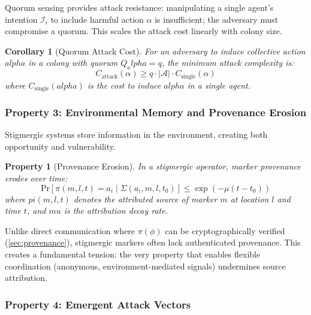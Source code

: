 \documentclass[
]{article}
\newtheorem{corollary}[theorem]{Corollary}
\newtheorem{property}{Property}[section]
\begin{document}
Quorum sensing provides attack resistance: manipulating a single agent's
intention \(\mathcal{I}_i\) to include harmful action \(\alpha\) is
insufficient; the adversary must compromise a quorum. This scales the
attack cost linearly with colony size.

\begin{corollary}[Quorum Attack Cost]
\label{cor:quorum-attack-cost}
For an adversary to induce collective action $alpha$ in a colony with quorum $Q_alpha = q$, the minimum attack complexity is:
\begin{equation}
\label{eq:quorum-cost}
C_{\text{attack}}(\alpha) \geq q \cdot |\mathcal{A}| \cdot C_{\text{single}}(\alpha)
\end{equation}
where $C_{\text{single}}(alpha)$ is the cost to induce $alpha$ in a single agent.
\end{corollary}

\subsubsection{Property 3: Environmental Memory and Provenance
Erosion}\label{sec:environmental-memory}

Stigmergic systems store information in the environment, creating both
opportunity and vulnerability.

\begin{property}[Provenance Erosion]
\label{prop:provenance-erosion}
In a stigmergic operator, marker provenance erodes over time:
\begin{equation}
\label{eq:provenance-erosion}
\text{Pr}\left[\pi(m, l, t) = a_i \mid \Sigma(a_i, m, l, t_0)\right] \leq \exp(-\mu(t - t_0))
\end{equation}
where $pi(m, l, t)$ denotes the attributed source of marker $m$ at location $l$ and time $t$, and $mu$ is the attribution decay rate.
\end{property}

Unlike direct communication where \(\pi(\phi)\) can be cryptographically
verified (\cref{sec:provenance}), stigmergic markers often lack
authenticated provenance. This creates a fundamental tension: the very
property that enables flexible coordination (anonymous,
environment-mediated signals) undermines source attribution.

\subsubsection{Property 4: Emergent Attack
Vectors}\label{sec:emergent-attacks}
\end{document}
